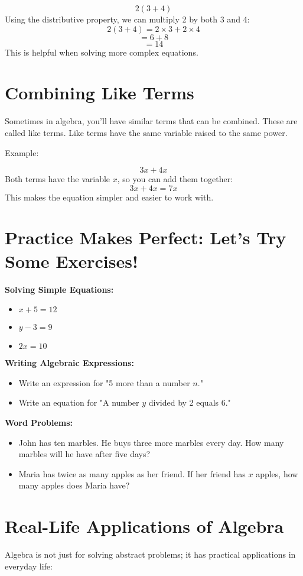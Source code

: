 \[ 2(3 + 4) \]
Using the distributive property, we can multiply 2 by both 3 and 4:
\[ 2(3 + 4) = 2 \times 3 + 2 \times 4 \]
\[ = 6 + 8 \]
\[ = 14 \]
This is helpful when solving more complex equations.

\section{Combining Like Terms}
Sometimes in algebra, you'll have similar terms that can be combined. These are called like terms. Like terms have the same variable raised to the same power.

Example:

\[ 3x + 4x \]
Both terms have the variable $x$, so you can add them together:
\[ 3x + 4x = 7x \]
This makes the equation simpler and easier to work with.

\section{Practice Makes Perfect: Let’s Try Some Exercises!}
\textbf{Solving Simple Equations:}
\begin{itemize}
    \item $x + 5 = 12$
    \item $y - 3 = 9$
    \item $2x = 10$
\end{itemize}

\textbf{Writing Algebraic Expressions:}
\begin{itemize}
    \item Write an expression for "5 more than a number $n$."
    \item Write an equation for "A number $y$ divided by 2 equals 6."
\end{itemize}

\textbf{Word Problems:}
\begin{itemize}
    \item John has ten marbles. He buys three more marbles every day. How many marbles will he have after five days?
    \item Maria has twice as many apples as her friend. If her friend has $x$ apples, how many apples does Maria have?
\end{itemize}

\section{Real-Life Applications of Algebra}
Algebra is not just for solving abstract problems; it has practical applications in everyday life:

